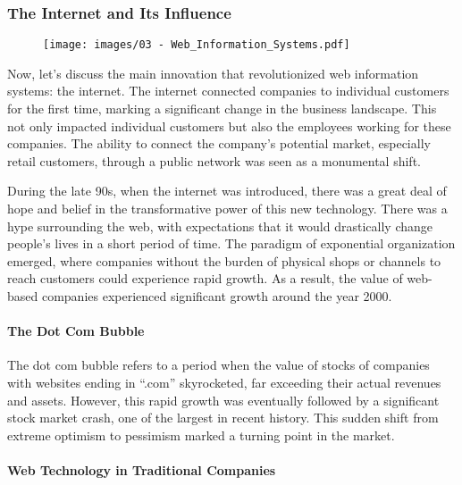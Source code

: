 \subsubsection{The Internet and Its
  Influence}\label{the-internet-and-its-influence}

\begin{figure}[!h]
  \centering
  \texttt{[image: images/03 - Web\_Information\_Systems.pdf]}
\end{figure}

Now, let's discuss the main innovation that revolutionized web
information systems: the internet. The internet connected companies to
individual customers for the first time, marking a significant change in
the business landscape. This not only impacted individual customers but
also the employees working for these companies. The ability to connect
the company's potential market, especially retail customers, through a
public network was seen as a monumental shift.

During the late 90s, when the internet was introduced, there was a great
deal of hope and belief in the transformative power of this new
technology. There was a hype surrounding the web, with expectations that
it would drastically change people's lives in a short period of time.
The paradigm of exponential organization emerged, where companies
without the burden of physical shops or channels to reach customers
could experience rapid growth. As a result, the value of web-based
companies experienced significant growth around the year 2000.

\paragraph{The Dot Com Bubble}\label{the-dot-com-bubble}

The dot com bubble refers to a period when the value of stocks of
companies with websites ending in ``.com'' skyrocketed, far exceeding
their actual revenues and assets. However, this rapid growth was
eventually followed by a significant stock market crash, one of the
largest in recent history. This sudden shift from extreme optimism to
pessimism marked a turning point in the market.

\paragraph{Web Technology in Traditional
  Companies}\label{web-technology-in-traditional-companies}

